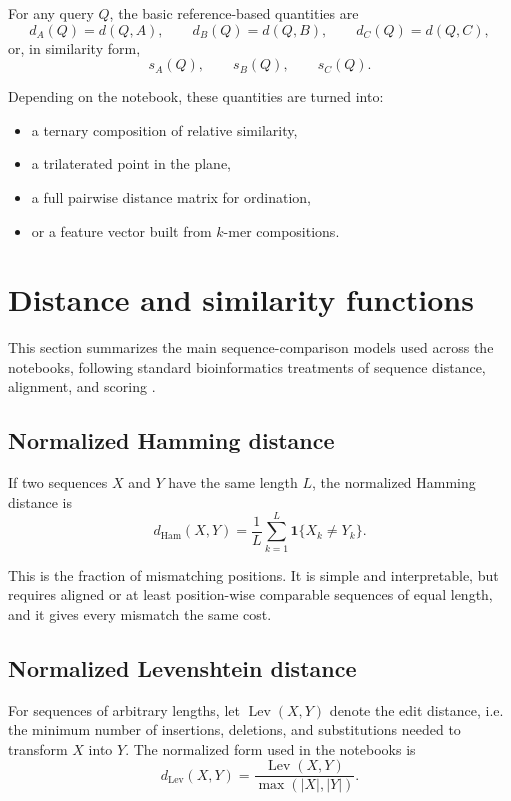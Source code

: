 \documentclass[11pt,a4paper]{article}
\begin{document}
For any query $Q$, the basic reference-based quantities are
\[
d_A(Q)=d(Q,A),\qquad d_B(Q)=d(Q,B),\qquad d_C(Q)=d(Q,C),
\]
or, in similarity form,
\[
s_A(Q),\qquad s_B(Q),\qquad s_C(Q).
\]

Depending on the notebook, these quantities are turned into:

\begin{itemize}[leftmargin=*]
\item a ternary composition of relative similarity,
\item a trilaterated point in the plane,
\item a full pairwise distance matrix for ordination,
\item or a feature vector built from $k$-mer compositions.
\end{itemize}

\section{Distance and similarity functions}

This section summarizes the main sequence-comparison models used across the notebooks, following standard bioinformatics treatments of sequence distance, alignment, and scoring \cite{Mount2004}.

\subsection{Normalized Hamming distance}

If two sequences $X$ and $Y$ have the same length $L$, the normalized Hamming distance is
\[
d_{\mathrm{Ham}}(X,Y)=\frac{1}{L}\sum_{k=1}^{L}\mathbf{1}\{X_k\neq Y_k\}.
\]

This is the fraction of mismatching positions. It is simple and interpretable, but requires aligned or at least position-wise comparable sequences of equal length, and it gives every mismatch the same cost.

\subsection{Normalized Levenshtein distance}

For sequences of arbitrary lengths, let $\operatorname{Lev}(X,Y)$ denote the edit distance, i.e. the minimum number of insertions, deletions, and substitutions needed to transform $X$ into $Y$. The normalized form used in the notebooks is
\[
d_{\mathrm{Lev}}(X,Y)=\frac{\operatorname{Lev}(X,Y)}{\max(|X|,|Y|)}.
\]
\end{document}
